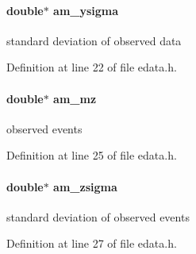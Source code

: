 \hypertarget{struct_exp_data_af29a27d415ab3b3f165e86473412baad}{}
\paragraph[{am\+\_\+ysigma}]{\setlength{\rightskip}{0pt plus 5cm}double$\ast$ am\+\_\+ysigma}\label{struct_exp_data_af29a27d415ab3b3f165e86473412baad}
standard deviation of observed data 

Definition at line 22 of file edata.\+h.

\hypertarget{struct_exp_data_a847258093bc307817a8c9cedc3f5edc3}{}
\paragraph[{am\+\_\+mz}]{\setlength{\rightskip}{0pt plus 5cm}double$\ast$ am\+\_\+mz}\label{struct_exp_data_a847258093bc307817a8c9cedc3f5edc3}
observed events 

Definition at line 25 of file edata.\+h.

\hypertarget{struct_exp_data_a806c9883d66f002acdcceaeda3e57fb2}{}
\paragraph[{am\+\_\+zsigma}]{\setlength{\rightskip}{0pt plus 5cm}double$\ast$ am\+\_\+zsigma}\label{struct_exp_data_a806c9883d66f002acdcceaeda3e57fb2}
standard deviation of observed events 

Definition at line 27 of file edata.\+h.


